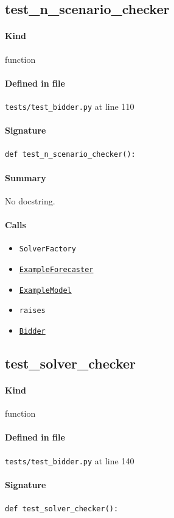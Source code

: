 \documentclass[11pt]{report}
\begin{document}
\subsection{test\_n\_scenario\_checker}
\label{def:tests-test_bidder.py:test_n_scenario_checker:L110}
\paragraph{Kind} function
\paragraph{Defined in file} \texttt{tests/test\_bidder.py} at line 110
\paragraph{Signature} \texttt{def test\_n\_scenario\_checker():}
\paragraph{Summary} No docstring.
\paragraph{Calls}
\begin{itemize}[leftmargin=*]
  \item \texttt{SolverFactory}
  \item \hyperref[def:tests-util.py:ExampleForecaster:L259]{\texttt{ExampleForecaster}}
  \item \hyperref[def:tests-util.py:ExampleModel:L25]{\texttt{ExampleModel}}
  \item \texttt{raises}
  \item \hyperref[def:bidder.py:Bidder:L1000]{\texttt{Bidder}}
\end{itemize}
\subsection{test\_solver\_checker}
\label{def:tests-test_bidder.py:test_solver_checker:L140}
\paragraph{Kind} function
\paragraph{Defined in file} \texttt{tests/test\_bidder.py} at line 140
\paragraph{Signature} \texttt{def test\_solver\_checker():}
\end{document}
